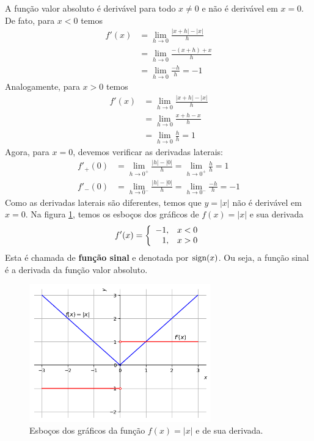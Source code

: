 \cleardoublepage\documentclass[../main.tex]{subfiles}
\begin{document}
 \begin{ex}\label{ex:Deriv-FuncValorAbs}
  A função valor absoluto é derivável para todo $x\neq 0$ e não é derivável em $x=0$. De fato, para $x<0$ temos
  \begin{align*}
    f'(x) &= \lim_{h\to 0} \frac{|x+h|-|x|}{h}\\
          &= \lim_{h\to 0} \frac{-(x+h)+x}{h}\\
          &= \lim_{h\to 0} \frac{-h}{h} = -1
  \end{align*}
  Analogamente, para $x>0$ temos
  \begin{align*}
    f'(x) &= \lim_{h\to 0} \frac{|x+h|-|x|}{h}\\
          &= \lim_{h\to 0} \frac{x+h-x}{h}\\
          &= \lim_{h\to 0} \frac{h}{h} = 1
  \end{align*}
  Agora, para $x=0$, devemos verificar as derivadas laterais:
  \begin{align*}
    f'_+(0) &= \lim_{h\to 0^+} \frac{|h|-|0|}{h} = \lim_{h\to 0^+} \frac{h}{h} = 1\\
    f'_-(0) &= \lim_{h\to 0^-} \frac{|h|-|0|}{h} = \lim_{h\to 0^-} \frac{-h}{h} = -1
  \end{align*}
  Como as derivadas laterais são diferentes, temos que $y = |x|$ não é derivável em $x=0$. Na figura \ref{fig:deriv_ex_ffl_absx}, temos os esboços dos gráficos de $f(x) = |x|$ e sua derivada
  \begin{equation}\label{eq:deriv_signx}
    f'(x) = \left\{
      \begin{array}[H]{rr}
        -1, & x<0\\
        1, & x> 0
      \end{array}
    \right.
  \end{equation}
  Esta é chamada de {\bf função sinal} e denotada por $\operatorname{sign}(x)$. Ou seja, a função sinal é a derivada da função valor absoluto.

  \begin{figure}[H]
    \centering
    \includegraphics[width=0.7\textwidth]{fig_deriv/fig_deriv_ex_ffl_absx}
    \caption{Esboços dos gráficos da função $f(x)=|x|$ e de sua derivada.}
    \label{fig:deriv_ex_ffl_absx}
  \end{figure}
\end{ex}
\end{document}
